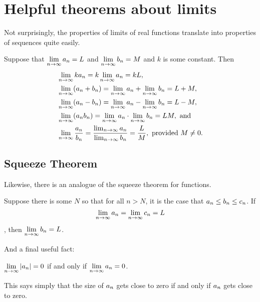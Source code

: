 \section{Helpful theorems about limits}

Not surprisingly, the properties of limits of real functions translate
into properties of sequences quite easily. 

\begin{theorem} \relax\label{thm:properties-of-sequences}
Suppose that $\displaystyle\lim_{n\to\infty}a_n=L$ and 
$\displaystyle\lim_{n\to\infty}b_n=M$ and
$k$ is some constant. Then
\begin{align*}
&\lim_{n\to\infty} ka_n = k\lim_{n\to\infty}a_n=kL, \\
&\lim_{n\to\infty} (a_n+b_n) = \lim_{n\to\infty}a_n+\lim_{n\to\infty}b_n=L+M, \\
&\lim_{n\to\infty} (a_n-b_n) = \lim_{n\to\infty}a_n-\lim_{n\to\infty}b_n=L-M, \\
&\lim_{n\to\infty} (a_nb_n) = \lim_{n\to\infty}a_n\cdot\lim_{n\to\infty}b_n=LM, \mbox{ and}\\
&\lim_{n\to\infty} {a_n\over b_n} = {\lim_{n\to\infty}a_n\over
  \lim_{n\to\infty}b_n}={L\over M},\hbox{ provided $M \neq 0$.} \\
\end{align*}
\end{theorem}

\subsection{Squeeze Theorem}

Likewise, there is an analogue of the squeeze theorem for functions.

\begin{theorem}\relax\label{thm:squeeze theorem for sequences}
Suppose there is some $N$ so that for all $n > N$, it is the case that $\displaystyle a_n \le b_n \le c_n$. If $$\displaystyle\lim_{n\to\infty}a_n=\displaystyle\lim_{n\to\infty}c_n=L$$, 
then $\displaystyle\lim_{n\to\infty}b_n=L$.
\end{theorem}

And a final useful fact:

\begin{theorem} \relax\label{thm:absolute value sequence}
$\displaystyle\lim_{n\to\infty}|a_n|=0$ if and only if
$\displaystyle\lim_{n\to\infty}a_n=0$.
\end{theorem}

This says simply that the size of $\displaystyle a_n$ gets close to zero if and
only if $\displaystyle a_n$ gets close to zero.

